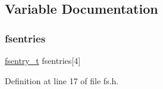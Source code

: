 \subsection{Variable Documentation}
\mbox{\label{a00152_a6b46131164b26e476762930c9aae4319_a6b46131164b26e476762930c9aae4319}} 
\subsubsection{\texorpdfstring{fsentries}{fsentries}}
{\footnotesize\ttfamily \hyperlink{a00152_a9ccf6560e8aebea3e4402a31e8c0f46b_a9ccf6560e8aebea3e4402a31e8c0f46b}{fsentry\+\_\+t} fsentries\mbox{[}4\mbox{]}}



Definition at line 17 of file fs.\+h.

